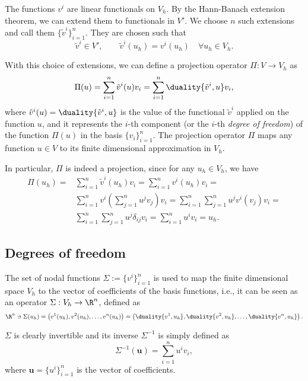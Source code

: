 The functions $v^i$ are linear functionals on $V_h$. By the Hann-Banach extension theorem, we can extend them to functionals in $V'$. We choose $n$ such extensions and call them $\{\tilde{v}^i\}_{i=1}^n$. They are chosen such that
\[
\tilde{v}^i \in V', \qquad \tilde{v}^i(u_h) = v^i(u_h) \quad \forall u_h \in V_h.
\]

With this choice of extensions, we can define a projection operator $\Pi: V \to V_h$ as
\[
\Pi(u) = \sum_{i=1}^n \tilde{v}^i(u) v_i = \sum_{i=1}^n \duality{\tilde{v}^i, u} v_i, 
\]
where $\tilde{v}^i(u)=\duality{\tilde{v}^i, u}$ is the value of the functional $\tilde{v}^i$ applied on the function $u$, and it represents the $i$-th component (or the $i$-th \emph{degree of freedom}) of the function $\Pi(u)$ in the basis $\{v_i\}_{i=1}^n$. The projection operator $\Pi$ maps any function $u \in V$ to its finite dimensional approximation in $V_h$. 

In particular, $\Pi$ is indeed a projection, since for any $u_h\in V_h$, we have 
\[
\begin{split}
  \Pi(u_h) = & \sum_{i=1}^n \tilde{v}^i(u_h) v_i = \sum_{i=1}^n v^i(u_h) v_i = \\
  &\sum_{i=1}^n v^i\left(\sum_{j=1}^n u^j v_j\right) v_i = \sum_{i=1}^n \sum_{j=1}^n u^j  v^i(v_j) v_i  = \\
  &\sum_{i=1}^n \sum_{j=1}^n u^j  \delta_{ij}  v_i  = \sum_{i=1}^n u^i v_i = u_h.
\end{split}
\]

\subsection{Degrees of freedom}
The set of nodal functions $\Sigma := \{v^i\}_{i=1}^n$ is used to map the finite
dimensional space $V_h$ to the vector of coefficients of the basis functions,
i.e., it can be seen as an operator $\Sigma: V_h \to \R^n$, defined as
\[ 
\R^n \ni \Sigma(u_h) = \left(v^1(u_h), v^2(u_h), \ldots, v^n(u_h)\right) = \left(\duality{v^1, u_h}, \duality{v^2, u_h}, \ldots, \duality{v^n, u_h}\right).
\]

$\Sigma$ is clearly invertible and its inverse $\Sigma^{-1}$ is simply defined as 
\[
\Sigma^{-1}(\mathbf{u}) = \sum_{i=1}^n u^i v_i,
\]
where $\mathbf{u} = \{u^i\}_{i=1}^n$ is the vector of coefficients.


